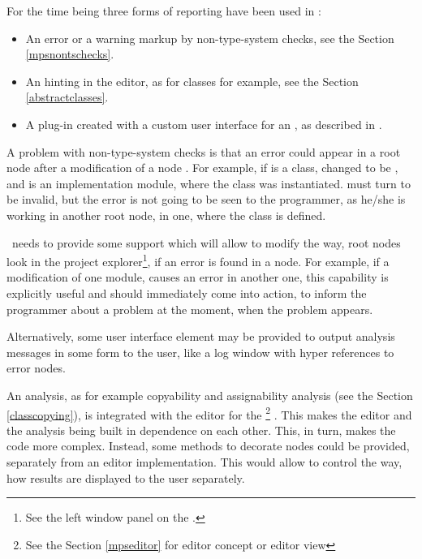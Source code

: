For the time being three forms of reporting have been used in \jbmps:

\begin{itemize}
 \item An error or a warning markup by non-type-system checks, see the Section \ref{mpsnontschecks}.
 \item An  hinting in the editor, as for  classes for example, see the Section \ref{abstractclasses}.
 \item A plug-in created with a custom user interface for an , as described in \cite{2012_ratiu_modular_dsls_and_analyses}.
\end{itemize}

A problem with non-type-system checks is that an error could appear in a root node  after a modification of a node . For example, if  is a class,
changed to be , and  is an implementation module, where the class  was instantiated.  must turn to be invalid, but the error
is not going to be seen to the programmer, as he/she is working in another root node, in one, where the  class is defined.

\jbmps\ needs to provide some support which will allow to modify the way, root nodes look in the project explorer\footnote{See the left window panel on the .},
if an error is found in a node. For example, if a modification of one module, causes an error in another one, this capability is explicitly useful and should
immediately come into action, to inform the programmer about a problem at the moment, when the problem appears.

Alternatively, some user interface element may be provided to output analysis messages in some form to the user, like a log window with hyper references to error nodes.

An  analysis, as for example copyability and assignability analysis (see the Section \ref{classcopying}), is integrated with the editor for the 
\footnote{See the Section \ref{mpseditor} for editor concept or editor view} . This makes the editor and the analysis being built in 
dependence on each other.
This, in turn, makes the code more complex. Instead, some methods to decorate nodes could be provided, separately from an editor implementation. This 
would allow to control the way, how  results are displayed to the user separately.

